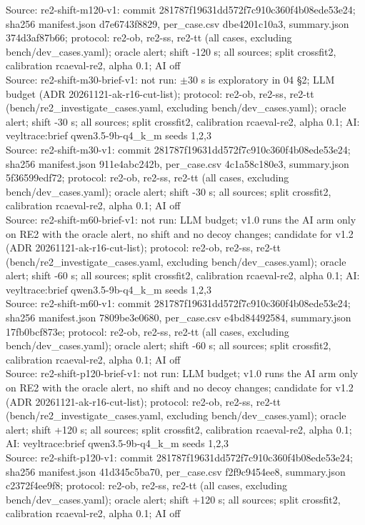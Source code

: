 \begin{table}[t]
Source: re2-shift-m120-v1: commit 281787f19631dd572f7c910c360f4b08ede53e24; sha256 manifest.json d7e6743f8829, per\_case.csv dbe4201c10a3, summary.json 374d3af87b66; protocol: re2-ob, re2-ss, re2-tt (all cases, excluding bench/dev\_cases.yaml); oracle alert; shift -120 s; all sources; split crossfit2, calibration rcaeval-re2, alpha 0.1; AI off\\
Source: re2-shift-m30-brief-v1: not run: $\pm$30 s is exploratory in 04 \S{}2; LLM budget (ADR 20261121-ak-r16-cut-list); protocol: re2-ob, re2-ss, re2-tt (bench/re2\_investigate\_cases.yaml, excluding bench/dev\_cases.yaml); oracle alert; shift -30 s; all sources; split crossfit2, calibration rcaeval-re2, alpha 0.1; AI: veyltrace:brief qwen3.5-9b-q4\_k\_m seeds 1,2,3\\
Source: re2-shift-m30-v1: commit 281787f19631dd572f7c910c360f4b08ede53e24; sha256 manifest.json 911e4abc242b, per\_case.csv 4c1a58c180e3, summary.json 5f36599edf72; protocol: re2-ob, re2-ss, re2-tt (all cases, excluding bench/dev\_cases.yaml); oracle alert; shift -30 s; all sources; split crossfit2, calibration rcaeval-re2, alpha 0.1; AI off\\
Source: re2-shift-m60-brief-v1: not run: LLM budget; v1.0 runs the AI arm only on RE2 with the oracle alert, no shift and no decoy changes; candidate for v1.2 (ADR 20261121-ak-r16-cut-list); protocol: re2-ob, re2-ss, re2-tt (bench/re2\_investigate\_cases.yaml, excluding bench/dev\_cases.yaml); oracle alert; shift -60 s; all sources; split crossfit2, calibration rcaeval-re2, alpha 0.1; AI: veyltrace:brief qwen3.5-9b-q4\_k\_m seeds 1,2,3\\
Source: re2-shift-m60-v1: commit 281787f19631dd572f7c910c360f4b08ede53e24; sha256 manifest.json 7809be3e0680, per\_case.csv e4bd84492584, summary.json 17fb0bcf873e; protocol: re2-ob, re2-ss, re2-tt (all cases, excluding bench/dev\_cases.yaml); oracle alert; shift -60 s; all sources; split crossfit2, calibration rcaeval-re2, alpha 0.1; AI off\\
Source: re2-shift-p120-brief-v1: not run: LLM budget; v1.0 runs the AI arm only on RE2 with the oracle alert, no shift and no decoy changes; candidate for v1.2 (ADR 20261121-ak-r16-cut-list); protocol: re2-ob, re2-ss, re2-tt (bench/re2\_investigate\_cases.yaml, excluding bench/dev\_cases.yaml); oracle alert; shift +120 s; all sources; split crossfit2, calibration rcaeval-re2, alpha 0.1; AI: veyltrace:brief qwen3.5-9b-q4\_k\_m seeds 1,2,3\\
Source: re2-shift-p120-v1: commit 281787f19631dd572f7c910c360f4b08ede53e24; sha256 manifest.json 41d345c5ba70, per\_case.csv f2f9c9454ee8, summary.json c2372f4ee9f8; protocol: re2-ob, re2-ss, re2-tt (all cases, excluding bench/dev\_cases.yaml); oracle alert; shift +120 s; all sources; split crossfit2, calibration rcaeval-re2, alpha 0.1; AI off\\

\end{table}

